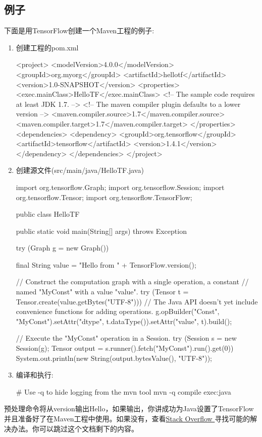 \subsection{例子}
下面是用TensorFlow创建一个Maven工程的例子:
\begin{enumerate}
\item 创建工程的pom.xml
\begin{xmlcode}
<project>
     <modelVersion>4.0.0</modelVersion>
     <groupId>org.myorg</groupId>
     <artifactId>hellotf</artifactId>
     <version>1.0-SNAPSHOT</version>
     <properties>
       <exec.mainClass>HelloTF</exec.mainClass>
       <!-- The sample code requires at least JDK 1.7. -->
       <!-- The maven compiler plugin defaults to a lower version -->
       <maven.compiler.source>1.7</maven.compiler.source>
       <maven.compiler.target>1.7</maven.compiler.target>
     </properties>
     <dependencies>
       <dependency>
         <groupId>org.tensorflow</groupId>
         <artifactId>tensorflow</artifactId>
         <version>1.4.1</version>
       </dependency>
     </dependencies>
 </project>
\end{xmlcode}
\item 创建源文件(src/main/java/HelloTF.java)
\begin{javacode}
import org.tensorflow.Graph;
import org.tensorflow.Session;
import org.tensorflow.Tensor;
import org.tensorflow.TensorFlow;

public class HelloTF {
  public static void main(String[] args) throws Exception {
    try (Graph g = new Graph()) {
      final String value = "Hello from " + TensorFlow.version();

      // Construct the computation graph with a single operation, a constant
      // named "MyConst" with a value "value".
      try (Tensor t = Tensor.create(value.getBytes("UTF-8"))) {
        // The Java API doesn't yet include convenience functions for adding operations.
        g.opBuilder("Const", "MyConst").setAttr("dtype", t.dataType()).setAttr("value", t).build();
      }

      // Execute the "MyConst" operation in a Session.
      try (Session s = new Session(g);
           Tensor output = s.runner().fetch("MyConst").run().get(0)) {
        System.out.println(new String(output.bytesValue(), "UTF-8"));
      }
    }
  }
}
\end{javacode}
\item 编译和执行:
\begin{bashcode}
 # Use -q to hide logging from the mvn tool
 mvn -q compile exec:java
\end{bashcode}
\end{enumerate}
预处理命令将从version输出Hello，如果输出，你讲成功为Java设置了TensorFlow并且准备好了在Maven工程中使用。如果没有，查看\href{http://stackoverflow.com/questions/tagged/tensorflow}{Stack Overflow }寻找可能的解决办法。你可以跳过这个文档剩下的内容。
